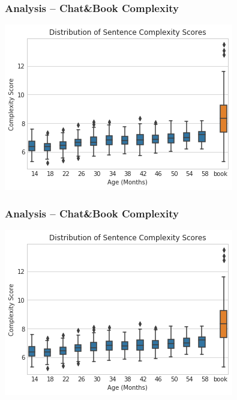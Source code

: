 \documentclass{beamer}
\begin{document}
\begin{frame}
	\frametitle{Analysis -- Chat\&Book Complexity}
	\begin{center}
		\includegraphics[width=.8\linewidth]{../real_plots/p&b_complex.png}
	\end{center}
\end{frame}
\begin{frame}
	\frametitle{Analysis -- Chat\&Book Complexity}
	\begin{center}
		\includegraphics[width=.8\linewidth]{../real_plots/p&b_complex.png}
	\end{center}
\end{frame}
\end{document}
